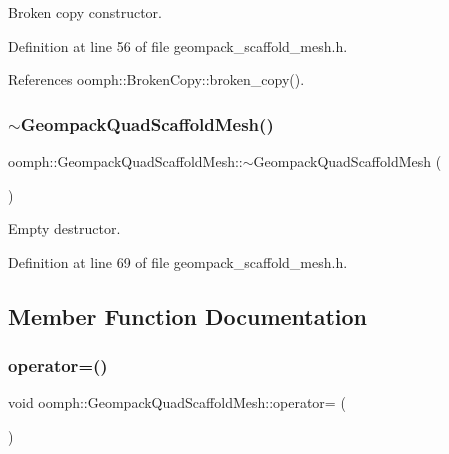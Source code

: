 Broken copy constructor. 



Definition at line 56 of file geompack\+\_\+scaffold\+\_\+mesh.\+h.



References oomph\+::\+Broken\+Copy\+::broken\+\_\+copy().

\mbox{\label{classoomph_1_1GeompackQuadScaffoldMesh_a6fd83d6d176dd54c218537d1dc61bd1d}} 
\subsubsection{\texorpdfstring{$\sim$\+Geompack\+Quad\+Scaffold\+Mesh()}{~GeompackQuadScaffoldMesh()}}
{\footnotesize\ttfamily oomph\+::\+Geompack\+Quad\+Scaffold\+Mesh\+::$\sim$\+Geompack\+Quad\+Scaffold\+Mesh (\begin{DoxyParamCaption}{ }\end{DoxyParamCaption})\hspace{0.3cm}{\ttfamily [inline]}}



Empty destructor. 



Definition at line 69 of file geompack\+\_\+scaffold\+\_\+mesh.\+h.



\subsection{Member Function Documentation}
\mbox{\label{classoomph_1_1GeompackQuadScaffoldMesh_a04b758450e0209b6c908d17b4fa13939}} 
\subsubsection{\texorpdfstring{operator=()}{operator=()}}
{\footnotesize\ttfamily void oomph\+::\+Geompack\+Quad\+Scaffold\+Mesh\+::operator= (\begin{DoxyParamCaption}\item[{const \hyperlink{classoomph_1_1GeompackQuadScaffoldMesh}{Geompack\+Quad\+Scaffold\+Mesh} \&}]{ }\end{DoxyParamCaption})\hspace{0.3cm}{\ttfamily [inline]}}



